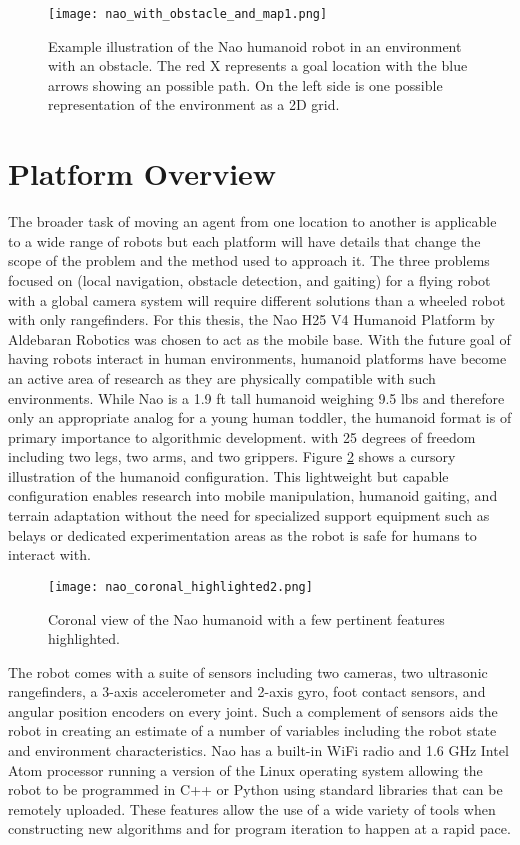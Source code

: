 \begin{figure}[h!]
	\centering
	\texttt{[image: nao\_with\_obstacle\_and\_map1.png]}
	\caption
	{Example illustration of the Nao humanoid robot in an environment with an obstacle. The red X represents a goal
		location with the blue arrows showing an possible path. On the left side is one possible representation
		of the environment as a 2D grid.}
	\label{fig:nao_with_map1}
\end{figure}


\section{Platform Overview}
The broader task of moving an agent from one location to another is applicable to a wide range of robots but
each platform will have details that change the scope of the problem and the method used to approach it.
The three problems focused on (local navigation, obstacle detection, and gaiting) for a flying robot with 
a global camera system will require different solutions than a wheeled robot with only rangefinders.
For this thesis, the Nao H25 V4 Humanoid Platform by Aldebaran Robotics was chosen to act as the mobile base. 
With the future goal of having robots interact in human environments, humanoid platforms have become an active
area of research as they are physically compatible with such environments. 
While Nao is a 1.9 ft tall humanoid weighing 9.5 lbs and therefore only an appropriate analog for a young human toddler,
the humanoid format is of primary importance to algorithmic development.
with 25 degrees of freedom including two legs, two arms, and two grippers. 
Figure \ref{fig:nao_diagram1} shows a cursory illustration of the humanoid configuration.
This lightweight but capable configuration enables research into mobile manipulation, humanoid gaiting, and terrain adaptation
without the need for specialized support equipment such as belays or dedicated experimentation areas as the
robot is safe for humans to interact with.

\begin{figure}
	\centering
	\texttt{[image: nao\_coronal\_highlighted2.png]}
	\caption
	{Coronal view of the Nao humanoid with a few pertinent features highlighted. }
	\label{fig:nao_diagram1}
\end{figure}

The robot comes with a suite of sensors including two cameras, two ultrasonic rangefinders, 
a 3-axis accelerometer and 2-axis gyro, foot contact sensors, and angular position encoders on every joint.
Such a complement of sensors aids the robot in creating an estimate of a number of variables including 
the robot state and environment characteristics. 
Nao has a built-in WiFi radio and 1.6 GHz Intel Atom processor running a version of the Linux operating system 
allowing the robot to be programmed in C++ or Python using standard libraries that can be remotely uploaded.
These features allow the use of a wide variety of tools when constructing new algorithms and for program
iteration to happen at a rapid pace.

